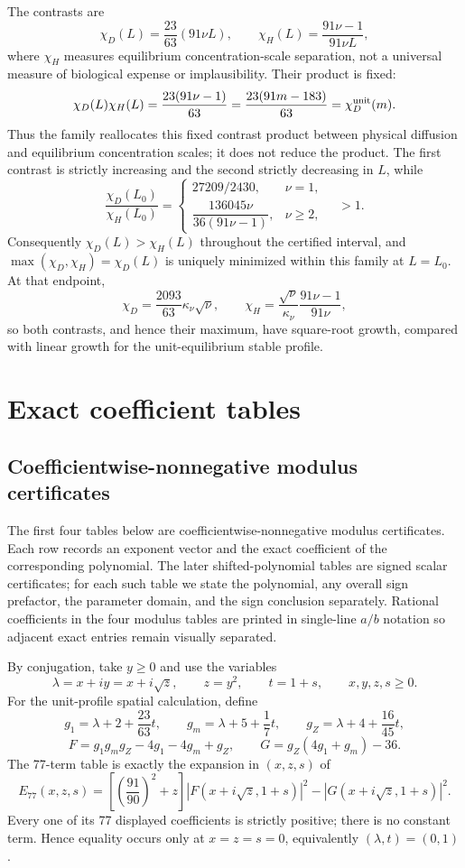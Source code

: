 \documentclass[10pt]{article}
\newcommand{\1}{\mathbf1}
\begin{document}
The contrasts are
\[
 \chi_D(L)=\frac{23}{63}(91\nu L),\qquad
 \chi_H(L)=\frac{91\nu-1}{91\nu L},
\]
where $\chi_H$ measures equilibrium concentration-scale separation, not a
universal measure of biological expense or implausibility.  Their product is
fixed:
\[
 \chi_D(L)\chi_H(L)=\frac{23(91\nu-1)}{63}
 =\frac{23(91m-183)}{63}=\chi_D^{\rm unit}(m).
\]
Thus the family reallocates this fixed contrast product between physical
diffusion and equilibrium concentration scales; it does not reduce the
product.  The first contrast is strictly increasing and the second strictly
decreasing in $L$, while
\[
 \frac{\chi_D(L_0)}{\chi_H(L_0)}=
 \begin{cases}
  27209/2430,&\nu=1,\\[2pt]
  \dfrac{136045\nu}{36(91\nu-1)},&\nu\ge2,
 \end{cases}
 \quad >1.
\]
Consequently $\chi_D(L)>\chi_H(L)$ throughout the certified interval, and
$\max(\chi_D,\chi_H)=\chi_D(L)$ is uniquely minimized within this family at
$L=L_0$.  At that endpoint,
\[
 \chi_D=\frac{2093}{63}\kappa_\nu\sqrt\nu,
 \qquad
 \chi_H=\frac{\sqrt\nu}{\kappa_\nu}\frac{91\nu-1}{91\nu},
\]
so both contrasts, and hence their maximum, have square-root growth, compared
with linear growth for the unit-equilibrium stable profile.

\section{Exact coefficient tables}\label{sec:coefftables}

\subsection{Coefficientwise-nonnegative modulus certificates}

The first four tables below are coefficientwise-nonnegative modulus
certificates.  Each row records an exponent vector and the exact coefficient
of the corresponding polynomial.  The later shifted-polynomial tables are
signed scalar certificates; for each such table we state the polynomial, any
overall sign prefactor, the parameter domain, and the sign conclusion
separately.  Rational coefficients in the four modulus tables are printed in
single-line $a/b$ notation so adjacent exact entries remain visually
separated.

By conjugation, take $y\ge0$ and use the variables
\[
 \lambda=x+i y=x+i\sqrt z,\qquad z=y^2,\qquad t=1+s,
 \qquad x,y,z,s\ge0.
\]
For the unit-profile spatial calculation, define
\[
 g_1=\lambda+2+\frac{23}{63}t,\qquad
 g_m=\lambda+5+\frac17t,\qquad
 g_Z=\lambda+4+\frac{16}{45}t,
\]
\[
 F=g_1g_mg_Z-4g_1-4g_m+g_Z,
 \qquad G=g_Z(4g_1+g_m)-36.
\]
The 77-term table is exactly the expansion in $(x,z,s)$ of
\[
 E_{77}(x,z,s)=
 \left[\left(\frac{91}{90}\right)^2+z\right]
 \left|F(x+i\sqrt z,1+s)\right|^2
 -\left|G(x+i\sqrt z,1+s)\right|^2.
\]
Every one of its 77 displayed coefficients is strictly positive; there is no
constant term.  Hence equality occurs only at $x=z=s=0$, equivalently
$(\lambda,t)=(0,1)$.
\end{document}
